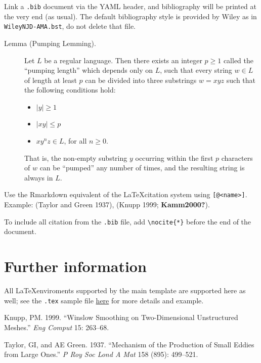 \documentclass[AMA,STIX1COL,]{WileyNJD-v2}
\providecommand{\tightlist}{%
  \setlength{\itemsep}{0pt}\setlength{\parskip}{0pt}}
\newlength{\cslhangindent}
\newlength{\cslentryspacingunit} %
\newenvironment{CSLReferences}[2] %
 {%
  \setlength{\parindent}{0pt}
  \ifodd #1
  \let\oldpar\par
  \def\par{\hangindent=\cslhangindent\oldpar}
  \fi
  \setlength{\parskip}{#2\cslentryspacingunit}
 }%
 {}
\begin{document}
Link a \texttt{.bib} document via the YAML header, and bibliography will
be printed at the very end (as usual). The default bibliography style is
provided by Wiley as in \texttt{WileyNJD-AMA.bst}, do not delete that
file.

\begin{description}
\item[Lemma (Pumping Lemming). \label{pumping}]
Let \(L\) be a regular language. Then there exists an integer
\(p \geq 1\) called the ``pumping length'' which depends only on \(L\),
such that every string \(w \in L\) of length at least \(p\) can be
divided into three substrings \(w = xyz\) such that the following
conditions hold:

\begin{itemize}
\tightlist
\item
  \(|y| \geq 1\)
\item
  \(|xy| \leq p\)
\item
  \(xy^n z \in L\), for all \(n \geq 0\).
\end{itemize}

That is, the non-empty substring \(y\) occurring within the first \(p\)
characters of \(w\) can be ``pumped'' any number of times, and the
resulting string is always in \(L\).
\end{description}

Use the Rmarkdown equivalent of the \LaTeX citation system using
\texttt{{[}@\textless{}name\textgreater{}{]}}. Example: (Taylor and
Green 1937), (Knupp 1999; \textbf{Kamm2000?}).

To include all citation from the \texttt{.bib} file, add
\texttt{\textbackslash{}nocite\{*\}} before the end of the document.

\hypertarget{further-information}{%
\section{Further information}\label{further-information}}

All \LaTeX enviroments supported by the main template are supported here
as well; see the \texttt{.tex} sample file
\href{http://onlinelibrary.wiley.com/journal/10.1002/(ISSN)1097-0258/homepage/la_tex_class_file.htm}{here}
for more details and example.

\hypertarget{refs}{}
\begin{CSLReferences}{1}{0}
\leavevmode{}%
Knupp, PM. 1999. {``Winslow Smoothing on Two-Dimensional Unstructured
Meshes.''} \emph{Eng {C}omput} 15: 263--68.

\leavevmode{}%
Taylor, GI, and AE Green. 1937. {``Mechanism of the Production of Small
Eddies from Large Ones.''} \emph{P {R}oy {S}oc {L}ond {A} {M}at} 158
(895): 499--521.

\end{CSLReferences}


\end{document}
